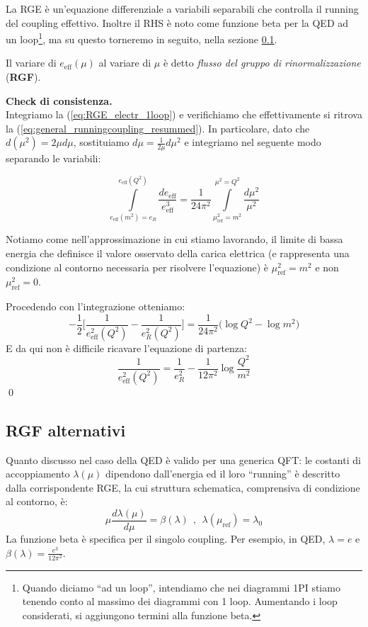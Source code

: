 \documentclass[../main.tex]{subfiles}
\begin{document}
La RGE è un'equazione differenziale a variabili separabili che controlla il running del coupling effettivo. Inoltre il RHS è noto come funzione beta per la QED ad un loop\footnote{Quando diciamo “ad un loop”, intendiamo che nei diagrammi 1PI stiamo tenendo conto al massimo dei diagrammi con 1 loop. Aumentando i loop considerati, si aggiungono termini alla funzione beta.}, ma su questo torneremo in seguito, nella sezione \ref{subsec:alternative_rgf}.

Il variare di \(e_\text{eff}(\mu)\) al variare di \(\mu\) è detto \textit{flusso del gruppo di rinormalizzazione} (\textbf{RGF}).

\begin{nota}
    \textbf{Check di consistenza.} \\
    Integriamo la (\ref{eq:RGE_electr_1loop}) e verifichiamo che effettivamente si ritrova la (\ref{eq:general_runningcoupling_resummed}). In particolare, dato che \(d(\mu^2) = 2\mu d\mu\), sostituiamo \(d\mu = \frac{1}{2\mu}d\mu^2\) e integriamo nel seguente modo separando le variabili:
    
    \[
    \int \limits_{e_\text{eff}(m^2)=e_R}^{e_\text{eff}(Q^2)} \frac{de_\text{eff}}{e_\text{eff}^3} = \frac{1}{24\pi^2} \int\limits_{\mu_{\text{ref}}^2=m^2}^{\mu^2=Q^2}\frac{d\mu^2}{\mu^2}
    \]
    
    Notiamo come nell'approssimazione in cui stiamo lavorando, il limite di bassa energia che definisce il valore osservato della carica elettrica (e rappresenta una condizione al contorno necessaria per risolvere l'equazione) è \(\mu_{\text{ref}}^2 = m^2\) e non \(\mu_{\text{ref}}^2 = 0\).
    
    Procedendo con l'integrazione otteniamo:
    \[
    -\frac{1}{2}\bigg[ \frac{1}{e_\text{eff}^2(Q^2)} - \frac{1}{e_R^2(Q^2)} \bigg] = \frac{1}{24\pi^2} \big( \log Q^2 - \log m^2 \big)
    \]
    E da qui non è difficile ricavare l'equazione di partenza:
    \[
    \frac{1}{e_\text{eff}^2(Q^2)} = 
    \frac{1}{e_R^2} - \frac{1}{12\pi^2}\log{\frac{Q^2}{m^2}}
    \] \qed
    
\end{nota}

\subsection{RGF alternativi}
\label{subsec:alternative_rgf}

Quanto discusso nel caso della QED è valido per una generica QFT: le costanti di accoppiamento $\lambda(\mu)$ dipendono dall'energia ed il loro “running” è descritto dalla corrispondente RGE, la cui struttura schematica, comprensiva di condizione al contorno, è:
\begin{equation}
    \mu\frac{d\lambda(\mu)}{d\mu} = \beta(\lambda) ~~,~~ \lambda(\mu_\text{ref})=\lambda_0
    \label{eq:RGE_generic}
\end{equation}
La funzione beta è specifica per il singolo coupling. Per esempio, in QED, \(\lambda = e\) e \(\beta(\lambda) = \frac{e^3}{12\pi^2}\).
\end{document}
